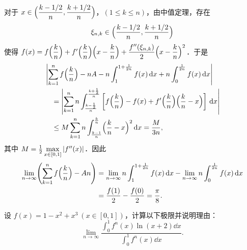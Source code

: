 \begin{solution}
对于 $x\in\Bigl(\dfrac{k-1/2}{n},\dfrac{k+1/2}{n}\Bigr)$，$(1\le k\le n)$，由中值定理，存在
\[
  \xi_{n,k}\in\Bigl(\frac{k-1/2}{n},\frac{k+1/2}{n}\Bigr)
\]
使得 $f(x)=f\Bigl(\dfrac{k}{n}\Bigr)+f'\Bigl(\dfrac{k}{n}\Bigr)\Bigl(x-\dfrac{k}{n}\Bigr)
+\dfrac{f''(\xi_{n,k})}{2}\Bigl(x-\dfrac{k}{n}\Bigr)^2$．于是
\begin{align*}
  &\left|\sum_{k=1}^{n}f\Bigl(\frac{k}{n}\Bigr)-nA
  -n\int_1^{1+\frac{1}{2n}}f(x)\,\mathrm{d} x+n\int_0^{\frac{1}{2n}}f(x)\,\mathrm{d} x\right|\\
  &\quad=\left|\sum_{k=1}^{n}n\int_{\frac{k-\frac12}{n}}^{\frac{k+\frac12}{n}}
  \left[f\Bigl(\frac{k}{n}\Bigr)-f(x)+f'\Bigl(\frac{k}{n}\Bigr)\Bigl(\frac{k}{n}-x\Bigr)\right]\,\mathrm{d} x\right|\\
  &\quad\le M\sum_{k=1}^{n}n\int_{\frac{k-1}{n}}^{\frac{k}{n}}\Bigl(\frac{k}{n}-x\Bigr)^2\,\mathrm{d} x=\frac{M}{3n},
\end{align*}
其中 $M=\frac12\max\limits_{x\in[0,1]}\left|f''(x)\right|$．因此
\begin{align*}
  \lim_{n\to\infty}\Biggl(\sum_{k=1}^{n}f\Bigl(\frac{k}{n}\Bigr)-An\Biggr)
  &=\lim_{n\to\infty}n\int_1^{1+\frac{1}{2n}}f(x)\,\mathrm{d} x
  -\lim_{n\to\infty}n\int_0^{\frac{1}{2n}}f(x)\,\mathrm{d} x\\
  &=\frac{f(1)}{2}-\frac{f(0)}{2}=\frac{\pi}{8}.
\end{align*}
\end{solution}

设 $f(x)=1-x^2+x^3\ (x\in[0,1])$，计算以下极限并说明理由：
\[
  \lim_{n\to\infty}\frac{\displaystyle\int_0^1 f^n(x)\ln(x+2)\dd x}{\displaystyle\int_0^1 f^n(x)\dd x}.
\]

